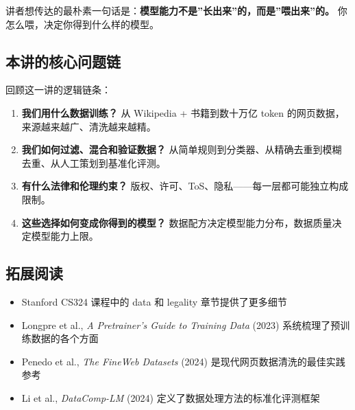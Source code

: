 \documentclass[a4paper]{article}
\begin{document}
讲者想传达的最朴素一句话是：\textbf{模型能力不是”长出来”的，而是”喂出来”的。} 你怎么喂，决定你得到什么样的模型。

\subsection{本讲的核心问题链}

回顾这一讲的逻辑链条：
\begin{enumerate}
    \item \textbf{我们用什么数据训练？} 从 Wikipedia + 书籍到数十万亿 token 的网页数据，来源越来越广、清洗越来越精。
    \item \textbf{我们如何过滤、混合和验证数据？} 从简单规则到分类器、从精确去重到模糊去重、从人工策划到基准化评测。
    \item \textbf{有什么法律和伦理约束？} 版权、许可、ToS、隐私——每一层都可能独立构成限制。
    \item \textbf{这些选择如何变成你得到的模型？} 数据配方决定模型能力分布，数据质量决定模型能力上限。
\end{enumerate}

\subsection{拓展阅读}

\begin{itemize}
    \item Stanford CS324 课程中的 data 和 legality 章节提供了更多细节
    \item Longpre et al., \textit{A Pretrainer's Guide to Training Data} (2023) 系统梳理了预训练数据的各个方面
    \item Penedo et al., \textit{The FineWeb Datasets} (2024) 是现代网页数据清洗的最佳实践参考
    \item Li et al., \textit{DataComp-LM} (2024) 定义了数据处理方法的标准化评测框架
\end{itemize}
\end{document}
